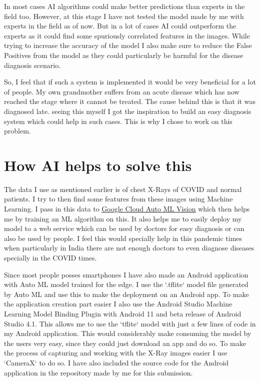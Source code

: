 \documentclass[a4paper]{article}
\begin{document}
\qquad In most cases AI algorithms could make better predictions than experts in the field too. However, at this stage I have not tested the model made by me with experts in the field as of now. But in a lot of cases AI could outperform the experts as it could find some spuriously correlated features in the images. While trying to increase the accuracy of the model I also make sure to reduce the False Positives from the model as they could particularly be harmful for the disease diagnosis scenario.

\qquad So, I feel that if such a system is implemented it would be very beneficial for a lot of people. My own grandmother suffers from an acute disease which has now reached the stage where it cannot be treated. The cause behind this is that it was diagnosed late. seeing this myself I got the inspiration to build an easy diagnosis system which could help in such cases. This is why I chose to work on this problem.

\section{How AI helps to solve this}

\qquad The data I use as mentioned earlier is of chest X-Rays of COVID and normal patients. I try to then find some features from these images using Machine Learning. I pass in this data to \href{https://cloud.google.com/vision/automl/docs}{Google Cloud Auto ML Vision} which then helps me by training an ML algorithm on this. It also helps me to easily deploy my model to a web service which can be used by doctors for easy diagnosis or can also be used by people. I feel this would specially help in this pandemic times when particularly in India there are not enough doctors to even diagnose diseases specially in the COVID times.

\qquad Since most people posses smartphones I have also made an Android application with Auto ML model trained for the edge. I use the `.tflite` model file generated by Auto ML and use this to make the deployment on an Android app. To make the application creation part easier I also use the Android Studio Machine Learning Model Binding Plugin with Android 11 and beta release of Android Studio 4.1. This allows me to use the `tflite` model with just a few lines of code in my Android application. This would considerably make consuming the model by the users very easy, since they could just download an app and do so. To make the process of capturing and working with the X-Ray images easier I use `CameraX` to do so. I have also included the source code for the Android application in the repository made by me for this submission.
\end{document}
